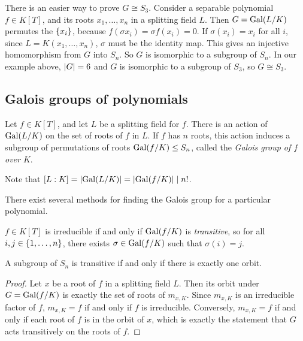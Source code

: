 There is an easier way to prove \( G \cong S_3 \).
Consider a separable polynomial \( f \in K[T] \), and its roots \( x_1, \dots, x_n \) in a splitting field \( L \).
Then \( G = \operatorname{Gal}(L / K) \) permutes the \( \qty{x_i} \), because \( f(\sigma x_i) = \sigma f(x_i) = 0 \).
If \( \sigma(x_i) = x_i \) for all \( i \), since \( L = K(x_1, \dots, x_n) \), \( \sigma \) must be the identity map.
This gives an injective homomorphism from \( G \) into \( S_n \).
So \( G \) is isomorphic to a subgroup of \( S_n \).
In our example above, \( \abs{G} = 6 \) and \( G \) is isomorphic to a subgroup of \( S_3 \), so \( G \cong S_3 \).

\subsection{Galois groups of polynomials}
\begin{definition}
	Let \( f \in K[T] \), and let \( L \) be a splitting field for \( f \).
	There is an action of \( \operatorname{Gal}(L/K) \) on the set of roots of \( f \) in \( L \).
	If \( f \) has \( n \) roots, this action induces a subgroup of permutations of roots \( \operatorname{Gal}(f/K) \leq S_n \), called the \emph{Galois group of \( f \) over \( K \)}.
\end{definition}
\begin{remark}
	Note that \( [L : K] = \abs{\operatorname{Gal}(L/K)} = \abs{\operatorname{Gal}(f/K)} \mid n! \).
\end{remark}
There exist several methods for finding the Galois group for a particular polynomial.
\begin{proposition}
	\( f \in K[T] \) is irreducible if and only if \( \operatorname{Gal}(f/K) \) is \emph{transitive}, so for all \( i, j \in \qty{1, \dots, n} \), there exists \( \sigma \in \operatorname{Gal}(f/K) \) such that \( \sigma(i) = j \).
\end{proposition}
\begin{remark}
	A subgroup of \( S_n \) is transitive if and only if there is exactly one orbit.
\end{remark}
\begin{proof}
	Let \( x \) be a root of \( f \) in a splitting field \( L \).
	Then its orbit under \( G = \operatorname{Gal}(f/K) \) is exactly the set of roots of \( m_{x,K} \).
	Since \( m_{x,K} \) is an irreducible factor of \( f \), \( m_{x,K} = f \) if and only if \( f \) is irreducible.
	Conversely, \( m_{x,K} = f \) if and only if each root of \( f \) is in the orbit of \( x \), which is exactly the statement that \( G \) acts transitively on the roots of \( f \).
\end{proof}
